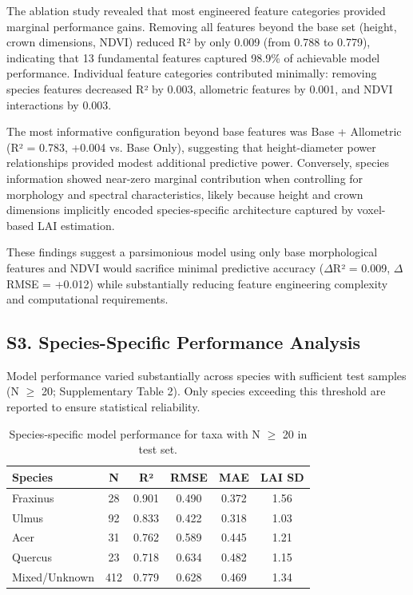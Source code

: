 \documentclass[11pt]{article}
\begin{document}
The ablation study revealed that most engineered feature categories provided marginal performance gains. Removing all features beyond the base set (height, crown dimensions, NDVI) reduced R² by only 0.009 (from 0.788 to 0.779), indicating that 13 fundamental features captured 98.9\% of achievable model performance. Individual feature categories contributed minimally: removing species features decreased R² by 0.003, allometric features by 0.001, and NDVI interactions by 0.003.

The most informative configuration beyond base features was Base + Allometric (R² = 0.783, +0.004 vs. Base Only), suggesting that height-diameter power relationships provided modest additional predictive power. Conversely, species information showed near-zero marginal contribution when controlling for morphology and spectral characteristics, likely because height and crown dimensions implicitly encoded species-specific architecture captured by voxel-based LAI estimation.

These findings suggest a parsimonious model using only base morphological features and NDVI would sacrifice minimal predictive accuracy ($\Delta$R² = 0.009, $\Delta$RMSE = +0.012) while substantially reducing feature engineering complexity and computational requirements.

\subsection*{S3. Species-Specific Performance Analysis}

Model performance varied substantially across species with sufficient test samples (N $\geq$ 20; Supplementary Table 2). Only species exceeding this threshold are reported to ensure statistical reliability.

\begin{table}[ht!]
    \centering
    \caption{Species-specific model performance for taxa with N $\geq$ 20 in test set.}
    \label{tab:supp_species}
    \begin{tabular}{lccccc}
        \toprule
        Species & N & R² & RMSE & MAE & LAI SD \\
        \midrule
        Fraxinus & 28 & 0.901 & 0.490 & 0.372 & 1.56 \\
        Ulmus & 92 & 0.833 & 0.422 & 0.318 & 1.03 \\
        Acer & 31 & 0.762 & 0.589 & 0.445 & 1.21 \\
        Quercus & 23 & 0.718 & 0.634 & 0.482 & 1.15 \\
        Mixed/Unknown & 412 & 0.779 & 0.628 & 0.469 & 1.34 \\
        \bottomrule
    \end{tabular}
\end{table}
\end{document}
